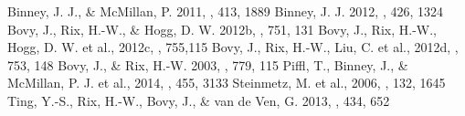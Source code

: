 \documentclass[12pt,preprint]{aastex}
\begin{document}
\begin{thebibliography}{}
 Binney, J. J., \& McMillan, P. 2011, \mnras, 413, 1889
 Binney, J. J. 2012, \mnras, 426, 1324
 Bovy, J., Rix, H.-W., \& Hogg, D. W. 2012b, \apj, 751, 131
 Bovy, J., Rix, H.-W., Hogg, D. W. et al., 2012c, \apj, 755,115
 Bovy, J., Rix, H.-W., Liu, C. et al., 2012d, \apj, 753, 148
  Bovy, J., \& Rix, H.-W. 2003, \apj, 779, 115
 Piffl, T., Binney, J., \& McMillan, P. J. et al., 2014, \mnras, 455, 3133
 Steinmetz, M. et al., 2006, \aj, 132, 1645
 Ting, Y.-S., Rix, H.-W., Bovy, J., \& van de Ven, G. 2013, \mnras, 434, 652
\end{thebibliography}
\end{document}
